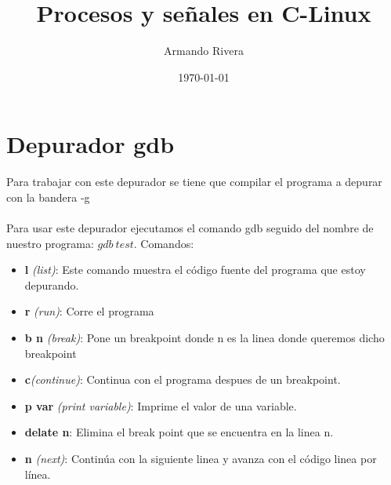 \documentclass{article}
\author{Armando Rivera}
\date{\today}
\title{Procesos y señales en C-Linux}
\begin{document}
	\maketitle
	\section{Depurador gdb}
	Para trabajar con este depurador se tiene que compilar el programa a depurar con la bandera -g\\
	\\Para usar este depurador ejecutamos el comando gdb seguido del nombre de nuestro programa: $gdb\ test$. Comandos:\\
	\begin{itemize}
		\item \textbf{l} \textit{(list)}: Este comando muestra	el código fuente del programa que estoy depurando.
		\item \textbf{r} \textit{(run)}: Corre el programa
		\item \textbf{b n} \textit{(break)}: Pone un breakpoint donde n es la linea donde queremos dicho breakpoint
		\item \textbf{c}\textit{(continue)}: Continua con el programa despues de un breakpoint.
		\item \textbf{p var} \textit{(print variable)}: Imprime el valor de una variable.
		\item \textbf{delate n}: Elimina el break point que se encuentra en la linea n.
		\item \textbf{n} \textit{(next)}: Continúa con la siguiente linea y avanza con el código linea por línea.
	\end{itemize}
\end{document}
